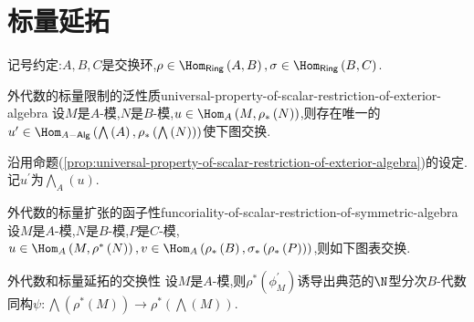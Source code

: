 \section{标量延拓}

记号约定:$A,B,C$是交换环,$\rho\in\Hom_{\mathsf{Ring}}\left(A,B\right),\sigma\in\Hom_{\mathsf{Ring}}\left(B,C\right)$.

\begin{proposition}{外代数的标量限制的泛性质}{universal-property-of-scalar-restriction-of-exterior-algebra}
	设$M$是$A$-模,$N$是$B$-模,$u\in\Hom_{A}\left(M,\rho_{\ast}\left(N\right)\right)$,则存在唯一的$u^{\prime}\in\Hom_{A-\mathsf{Alg}}\left(\bigwedge\left(A\right),\rho_{\ast}\left(\bigwedge\left(N\right)\right)\right)$使下图交换.
	\begin{center}
	\end{center}
\end{proposition}

\begin{definition}{}{}
	沿用命题(\cref{prop:universal-property-of-scalar-restriction-of-exterior-algebra})的设定.记$u^{\prime}$为$\bigwedge_{A}\left(u\right)$.
\end{definition}

\begin{proposition}{外代数的标量扩张的函子性}{funcoriality-of-scalar-restriction-of-symmetric-algebra}
	设$M$是$A$-模,$N$是$B$-模,$P$是$C$-模,$u\in\Hom_{A}\left(M,\rho^{\ast}\left(N\right)\right),v\in\Hom_{A}\left(\rho_{\ast}\left(B\right),\sigma_{\ast}\left(\rho_{\ast}\left(P\right)\right)\right)$,则如下图表交换.
	\begin{center}
	\end{center}
\end{proposition}

\begin{proposition}{外代数和标量延拓的交换性}{}
	设$M$是$A$-模,则$\rho^{\ast}\left(\phi_{M}^{\prime}\right)$诱导出典范的$\N$型分次$B$-代数同构$\psi:\bigwedge\left(\rho^{\ast}\left(M\right)\right)\to\rho^{\ast}\left(\bigwedge\left(M\right)\right)$.
\end{proposition}
